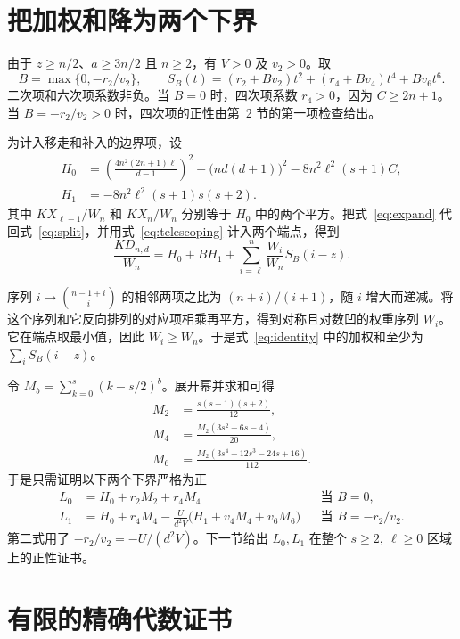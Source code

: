 \documentclass[11pt,UTF8,fontset=fandol,scheme=plain]{ctexart}
\newcommand{\Dx}{D_{n,d}}
\newcommand{\ellbound}{\ell}
\begin{document}
\clearpage
\section{把加权和降为两个下界}

由于 \(z\ge n/2\)、\(a\ge3n/2\) 且 \(n\ge2\)，有 \(V>0\) 及 \(v_2>0\)。取
\[
 B=\max\{0,-r_2/v_2\},\qquad
 S_B(t)=(r_2+Bv_2)t^2+(r_4+Bv_4)t^4+Bv_6t^6.
\]
二次项和六次项系数非负。当 \(B=0\) 时，四次项系数 \(r_4>0\)，因为 \(C\ge2n+1\)。当 \(B=-r_2/v_2>0\) 时，四次项的正性由第~\ref{sec:certificate} 节的第一项检查给出。

为计入移走和补入的边界项，设
\begin{align*}
 H_0&=\left(\frac{4n^2(2n+1)\ellbound}{d-1}\right)^2
       -\bigl(nd(d+1)\bigr)^2 -8n^2\ellbound^2(s+1)C,\\
 H_1&=-8n^2\ellbound^2(s+1)s(s+2).
\end{align*}
其中 \(KX_{\ellbound-1}/W_n\) 和 \(KX_n/W_n\) 分别等于 \(H_0\) 中的两个平方。把式~\eqref{eq:expand} 代回式~\eqref{eq:split}，并用式~\eqref{eq:telescoping} 计入两个端点，得到
\begin{equation}
  \frac{K\Dx}{W_n}=H_0+BH_1+\sum_{i=\ellbound}^{n}\frac{W_i}{W_n}S_B(i-z).
  \label{eq:identity}
\end{equation}

序列 \(i\mapsto\binom{n-1+i}{i}\) 的相邻两项之比为 \((n+i)/(i+1)\)，随 \(i\) 增大而递减。将这个序列和它反向排列的对应项相乘再平方，得到对称且对数凹的权重序列 \(W_i\)。它在端点取最小值，因此 \(W_i\ge W_n\)。于是式~\eqref{eq:identity} 中的加权和至少为 \(\sum_i S_B(i-z)\)。

令 \(M_b=\sum_{k=0}^{s}(k-s/2)^b\)。展开幂并求和可得
\begin{align*}
  M_2 &= \frac{s(s+1)(s+2)}{12},\\
  M_4 &= \frac{M_2(3s^2+6s-4)}{20},\\
  M_6 &= \frac{M_2(3s^4+12s^3-24s+16)}{112}.
\end{align*}
于是只需证明以下两个下界严格为正
\begin{align}
  L_0&=H_0+r_2M_2+r_4M_4
       &&\text{当 } B=0, \label{eq:L0}\\
  L_1&=H_0+r_4M_4-\frac{U}{d^2V}\bigl(H_1+v_4M_4+v_6M_6\bigr)
       &&\text{当 } B=-r_2/v_2. \label{eq:L1}
\end{align}
第二式用了 \(-r_2/v_2=-U/(d^2V)\)。下一节给出 \(L_0,L_1\) 在整个 \(s\ge2,\ \ellbound\ge0\) 区域上的正性证书。

\clearpage
\section{有限的精确代数证书}\label{sec:certificate}
\end{document}
